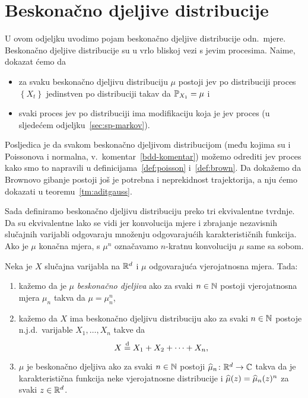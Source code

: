 \documentclass[main.tex]{subfiles}
\begin{document}
\nocite{*}

\section{Beskonačno djeljive distribucije} \label{sec:sp-bdd}
U ovom odjeljku uvodimo pojam beskonačno djeljive distribucije odn.\ mjere. Beskonačno djeljive
distribucije su u vrlo bliskoj vezi s \levy jevim procesima. Naime, dokazat ćemo da
\begin{itemize}
	\item za svaku beskonačno djeljivu distribuciju \( \mu \) postoji \levy jev po distribuciji proces \( \left\{ X_t \right\} \)
	      jedinstven po distribuciji takav da \( \P_{X_1} = \mu \) i
	\item svaki proces \levy jev po distribuciji ima modifikaciju koja je \levy jev proces (u sljedećem odjeljku~\ref{sec:sp-markov}).
\end{itemize}
Posljedica je da svakom beskonačno djeljivom distribucijom (među kojima su i Poissonova i normalna, v.\ komentar~\ref{bdd-komentar}) možemo
odrediti \levy jev proces kako smo to napravili u definicijama~\ref{def:poisson} i~\ref{def:brown}. Da dokažemo
da Brownovo gibanje postoji još je potrebna i neprekidnost trajektorija, a nju ćemo dokazati u teoremu~\ref{tm:aditgauss}.

Sada definiramo beskonačno djeljivu distribuciju preko tri ekvivalentne tvrdnje. Da su ekvivalentne lako se vidi
jer konvolucija mjere i zbrajanje nezavisnih slučajnih varijabli odgovaraju množenju odgovarajućih karakterističnih funkcija.
Ako je \( \mu \) konačna mjera, s \( \mu^n \) označavamo \( n \)-kratnu konvoluciju \( \mu \) same sa sobom.

\begin{definicija} \label{deF:bdd}
	Neka je \( X \) slučajna varijabla na \( \R^d \) i \( \mu \) odgovarajuća vjerojatnosna mjera. Tada:
	\begin{enumerate}[label=(\roman*)]
		\item kažemo da je \( \mu \) \emph{beskonačno djeljiva} ako za svaki \( n \in \N \) postoji vjerojatnosna mjera \( \mu_n \)
		      takva da \( \mu = \mu_n^n \),
		\item kažemo da \( X \) ima beskonačno djeljivu distribuciju ako za svaki \( n \in \N \) postoje n.j.d.\ varijable \( X_1, \ldots, X_n \)
		      takve da \label{item:defbdd2}
		      \[
			      X \jpod X_1 + X_2 + \cdots + X_n,
		      \]
		\item \( \mu \) je beskonačno djeljiva ako za svaki \( n \in \N \) postoji \( \wh \mu_n \colon \R^d \to \C \)
		      takva da je karakteristična funkcija neke vjerojatnosne distribucije i \( \wh \mu (z) = \wh \mu_n(z)^n \) za svaki \( z \in \R^d \).
	\end{enumerate}
\end{definicija}
\end{document}
